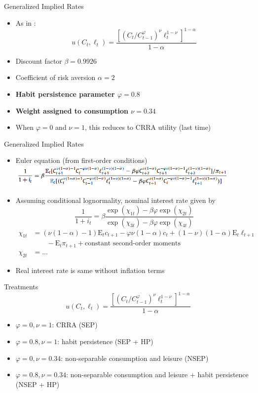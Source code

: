 \documentclass{beamer}
\def\E{\text{E}}
\begin{document}
\begin{frame}{Generalized Implied Rates}
\begin{itemize}
\item As in \cite{collard11}: $$u(C_t, \ell_t) = \frac{[(C_t/C_{t-1}^\varphi)^\nu \ell_t^{1-\nu}]^{1-\alpha}}{1-\alpha}$$
\item Discount factor $\beta = 0.9926$
\item Coefficient of risk aversion $\alpha = 2$
\item \textbf{Habit persistence parameter $\varphi = 0.8$}
\item \textbf{Weight assigned to consumption $\nu = 0.34$}
\item When $\varphi = 0$ and $\nu = 1$, this reduces to CRRA utility (last time)
\end{itemize}
\end{frame}

\begin{frame}{Generalized Implied Rates}
\begin{itemize}
\item Euler equation (from first-order conditions)
  \includegraphics[width=0.9\textwidth]{figs/euler-equation.png}
\item Assuming conditional lognormality, nominal interest rate given by
$$\frac{1}{1+i_t} = \beta \frac{\exp(\chi_{1t}) - \beta \varphi \exp(\chi_{2t})}{\exp(\chi_{3t}) - \beta \varphi \exp(\chi_{4t})}$$
\begin{align*}
\chi_{1t} &= (\nu(1-\alpha)-1) \E_t c_{t+1} - \varphi\nu(1-\alpha)c_t + (1-\nu)(1-\alpha) \E_t \ell_{t+1} \\
  &\qquad - \E_t \pi_{t+1} + \text{constant second-order moments} \\
\chi_{2t} &= \ldots
\end{align*}
\item Real interest rate is same without inflation terms
\end{itemize}
\end{frame}

\begin{frame}{Treatments}
$$u(C_t, \ell_t) = \frac{[(C_t/C_{t-1}^\varphi)^\nu \ell_t^{1-\nu}]^{1-\alpha}}{1-\alpha}$$
\begin{itemize}
\item $\varphi = 0, \nu = 1$: CRRA (SEP)
\item $\varphi = 0.8, \nu = 1$: habit persistence (SEP + HP)
\item $\varphi = 0, \nu = 0.34$: non-separable consumption and leisure (NSEP)
\item $\varphi = 0.8, \nu = 0.34$: non-separable consumption and leisure + habit persistence (NSEP + HP)
\end{itemize}
\end{frame}
\end{document}
